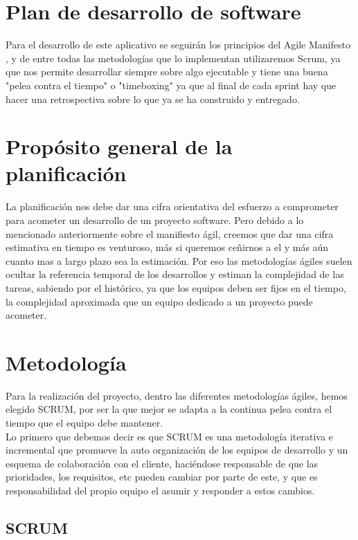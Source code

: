 \documentclass[../pfc.tex]{subfiles}
\begin{document}
	
	\section{Plan de desarrollo de software}
	
	Para el desarrollo de este aplicativo se seguirán los principios del Agile Manifesto \cite{agile}, y de entre todas las metodologías que lo implementan utilizaremos Scrum, ya que nos permite desarrollar siempre sobre algo ejecutable y tiene una buena "pelea contra el tiempo" o "timeboxing" ya que al final de cada sprint hay que hacer una retrospectiva sobre lo que ya se ha construido y entregado.

	\section{Propósito general de la planificación}
	
	La planificación nos debe dar una cifra orientativa del esfuerzo a comprometer para acometer un desarrollo de un proyecto software. Pero debido a lo mencionado anteriormente sobre el manifiesto ágil, creemos que dar una cifra estimativa en tiempo es venturoso, más si queremos ceñirnos a el y más aún cuanto mas a largo plazo sea la estimación. Por eso las metodologías ágiles suelen ocultar la referencia temporal de los desarrollos y estiman la complejidad de las tareas, sabiendo por el histórico, ya que los equipos deben ser fijos en el tiempo, la complejidad aproximada que un equipo dedicado a un proyecto puede acometer. 
	
	\section{Metodología }
	
	Para la realización del proyecto, dentro las diferentes metodologías ágiles, hemos elegido SCRUM, por ser la que mejor se adapta a la continua pelea contra el tiempo que el equipo debe mantener. \\
	Lo primero que debemos decir es que SCRUM es una metodología iterativa e incremental que promueve la auto organización de los equipos de desarrollo y un esquema de colaboración con el cliente, haciéndose responsable de que las prioridades, los requisitos, etc pueden cambiar por parte de este, y que es responsabilidad del propio equipo el asumir y responder a estos cambios. 
	
	\subsection{SCRUM}
	
\end{document}
